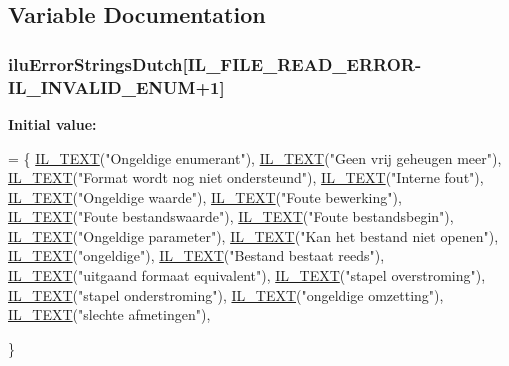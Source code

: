 \subsection{Variable Documentation}
\hypertarget{ilu__err-dutch_8h_a5cd7601aa0c9681edf0a8f8e99fd1f09}{
\subsubsection[{ilu\-Error\-Strings\-Dutch}]{ ilu\-Error\-Strings\-Dutch\mbox{[}{\bf I\-L\-\_\-\-F\-I\-L\-E\-\_\-\-R\-E\-A\-D\-\_\-\-E\-R\-R\-O\-R}-\/{\bf I\-L\-\_\-\-I\-N\-V\-A\-L\-I\-D\-\_\-\-E\-N\-U\-M}+1\mbox{]}}}\label{ilu__err-dutch_8h_a5cd7601aa0c9681edf0a8f8e99fd1f09}
{\bfseries Initial value\-:}
\begin{DoxyCode}
= \{
    \hyperlink{il_8h_a2907c2129d2ba2ebbae6aa6a69b7f685}{IL\_TEXT}(\textcolor{stringliteral}{"Ongeldige enumerant"}),
    \hyperlink{il_8h_a2907c2129d2ba2ebbae6aa6a69b7f685}{IL\_TEXT}(\textcolor{stringliteral}{"Geen vrij geheugen meer"}),
    \hyperlink{il_8h_a2907c2129d2ba2ebbae6aa6a69b7f685}{IL\_TEXT}(\textcolor{stringliteral}{"Format wordt nog niet ondersteund"}),
    \hyperlink{il_8h_a2907c2129d2ba2ebbae6aa6a69b7f685}{IL\_TEXT}(\textcolor{stringliteral}{"Interne fout"}),
    \hyperlink{il_8h_a2907c2129d2ba2ebbae6aa6a69b7f685}{IL\_TEXT}(\textcolor{stringliteral}{"Ongeldige waarde"}),
    \hyperlink{il_8h_a2907c2129d2ba2ebbae6aa6a69b7f685}{IL\_TEXT}(\textcolor{stringliteral}{"Foute bewerking"}),
    \hyperlink{il_8h_a2907c2129d2ba2ebbae6aa6a69b7f685}{IL\_TEXT}(\textcolor{stringliteral}{"Foute bestandswaarde"}),
    \hyperlink{il_8h_a2907c2129d2ba2ebbae6aa6a69b7f685}{IL\_TEXT}(\textcolor{stringliteral}{"Foute bestandsbegin"}),
    \hyperlink{il_8h_a2907c2129d2ba2ebbae6aa6a69b7f685}{IL\_TEXT}(\textcolor{stringliteral}{"Ongeldige parameter"}),
    \hyperlink{il_8h_a2907c2129d2ba2ebbae6aa6a69b7f685}{IL\_TEXT}(\textcolor{stringliteral}{"Kan het bestand niet openen"}),
    \hyperlink{il_8h_a2907c2129d2ba2ebbae6aa6a69b7f685}{IL\_TEXT}(\textcolor{stringliteral}{"ongeldige"}),
    \hyperlink{il_8h_a2907c2129d2ba2ebbae6aa6a69b7f685}{IL\_TEXT}(\textcolor{stringliteral}{"Bestand bestaat reeds"}),
    \hyperlink{il_8h_a2907c2129d2ba2ebbae6aa6a69b7f685}{IL\_TEXT}(\textcolor{stringliteral}{"uitgaand formaat equivalent"}),
    \hyperlink{il_8h_a2907c2129d2ba2ebbae6aa6a69b7f685}{IL\_TEXT}(\textcolor{stringliteral}{"stapel overstroming"}),
    \hyperlink{il_8h_a2907c2129d2ba2ebbae6aa6a69b7f685}{IL\_TEXT}(\textcolor{stringliteral}{"stapel onderstroming"}),
    \hyperlink{il_8h_a2907c2129d2ba2ebbae6aa6a69b7f685}{IL\_TEXT}(\textcolor{stringliteral}{"ongeldige omzetting"}),
    \hyperlink{il_8h_a2907c2129d2ba2ebbae6aa6a69b7f685}{IL\_TEXT}(\textcolor{stringliteral}{"slechte afmetingen"}),

\}
\end{DoxyCode}
